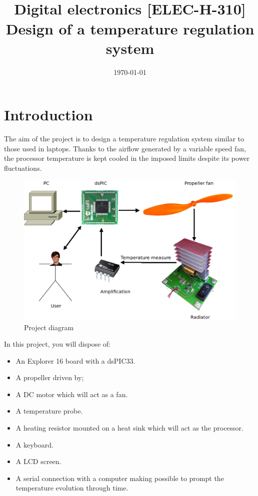 \documentclass[11pt,a4paper]{article}
\date{\vspace{-1.7cm}\mydate\today}
\title{\vspace{-2cm} \labonumber\\ Digital electronics [ELEC-H-310]\\Design of a temperature regulation system\ifthenelse{\boolean{corrige}}{~\\Corrigé}{}}
\theoremstyle{definition}%
\begin{document}
\pagestyle{empty}
\maketitle



\section{Introduction}
The aim of the project is to design a temperature regulation system similar to those used in laptops.
Thanks to the airflow generated by a variable speed fan, the processor temperature is kept cooled in the imposed limits despite its power fluctuations.

\begin{center}
\begin{figure}[H]
\includegraphics[width=\textwidth]{workflow}
\caption{Project diagram}
\label{fig:workflow}
\end{figure}
\end{center}

In this project, you will dispose of:
\begin{itemize}
	\item An Explorer 16 board with a dsPIC33.
	\item A propeller driven by;
	\item A DC motor which will act as a fan.
	\item A temperature probe.
	\item A heating resistor mounted on a heat sink which will act as the processor.
	\item A keyboard.
	\item A LCD screen.
	\item A serial connection with a computer making possible to prompt the temperature evolution through time.
\end{itemize}
\end{document}
